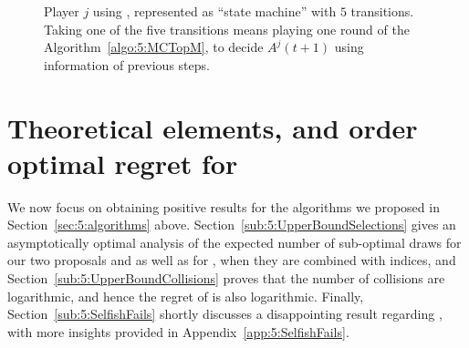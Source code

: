 \begin{figure}[h!]
  \caption[``State-machine'' representation of \MCTopM]{Player $j$ using \MCTopM, represented as ``state machine'' with $5$ transitions.
  Taking one of the five transitions means playing one round of the Algorithm~\ref{algo:5:MCTopM}, to decide $A^j(t+1)$ using information of previous steps.}
  \label{fig:5:StateMachineAlgorithm_MCTopM}
\end{figure}



\section{Theoretical elements, and order optimal regret for \MCTopM}
\label{sec:5:upperbounds}

We now focus on obtaining positive results for the algorithms we proposed in Section~\ref{sec:5:algorithms} above.
Section~\ref{sub:5:UpperBoundSelections} gives
an asymptotically optimal analysis of the expected number of sub-optimal draws
for our two proposals \RandTopM{} and \MCTopM{} as well as for \rhoRand{}, when they are combined with \klUCB{} indices,
and Section~\ref{sub:5:UpperBoundCollisions} proves that the number of collisions are logarithmic, and hence the regret of \MCTopM{} is also logarithmic.
%
Finally, Section~\ref{sub:5:SelfishFails} shortly discusses a disappointing result regarding \Selfish{}, with more insights provided in Appendix~\ref{app:5:SelfishFails}.


